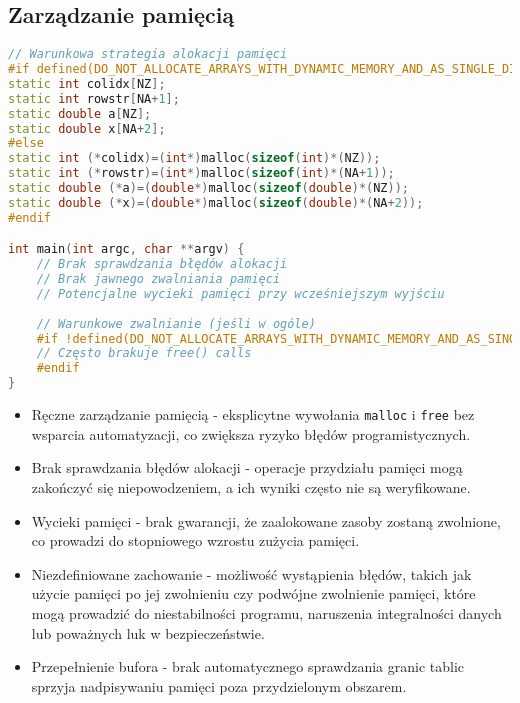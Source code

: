 \subsection{Zarządzanie pamięcią}
\begin{lstlisting}[language=C++, style=VS2017,  caption={Zarządzanie pamięcią w benchmarkach C++ z OpenMP}, label={lst:openmp_memory}]
// Warunkowa strategia alokacji pamięci
#if defined(DO_NOT_ALLOCATE_ARRAYS_WITH_DYNAMIC_MEMORY_AND_AS_SINGLE_DIMENSION)
static int colidx[NZ];
static int rowstr[NA+1];
static double a[NZ];
static double x[NA+2];
#else
static int (*colidx)=(int*)malloc(sizeof(int)*(NZ));
static int (*rowstr)=(int*)malloc(sizeof(int)*(NA+1));
static double (*a)=(double*)malloc(sizeof(double)*(NZ));
static double (*x)=(double*)malloc(sizeof(double)*(NA+2));
#endif

int main(int argc, char **argv) {
    // Brak sprawdzania błędów alokacji
    // Brak jawnego zwalniania pamięci
    // Potencjalne wycieki pamięci przy wcześniejszym wyjściu
    
    // Warunkowe zwalnianie (jeśli w ogóle)
    #if !defined(DO_NOT_ALLOCATE_ARRAYS_WITH_DYNAMIC_MEMORY_AND_AS_SINGLE_DIMENSION)
    // Często brakuje free() calls
    #endif
}
\end{lstlisting}
\begin{itemize}
    \item Ręczne zarządzanie pamięcią - eksplicytne wywołania \texttt{malloc} i \texttt{free} bez wsparcia automatyzacji, co zwiększa ryzyko błędów programistycznych.
    
    \item Brak sprawdzania błędów alokacji - operacje przydziału pamięci mogą zakończyć się niepowodzeniem, a ich wyniki często nie są weryfikowane.
    
    \item Wycieki pamięci - brak gwarancji, że zaalokowane zasoby zostaną zwolnione, co prowadzi do stopniowego wzrostu zużycia pamięci.
    
    \item Niezdefiniowane zachowanie - możliwość wystąpienia błędów, takich jak użycie pamięci po jej zwolnieniu czy podwójne zwolnienie pamięci, które mogą prowadzić do niestabilności programu, naruszenia integralności danych lub poważnych luk w bezpieczeństwie.
    
    \item Przepełnienie bufora - brak automatycznego sprawdzania granic tablic sprzyja nadpisywaniu pamięci poza przydzielonym obszarem.
\end{itemize}
  
